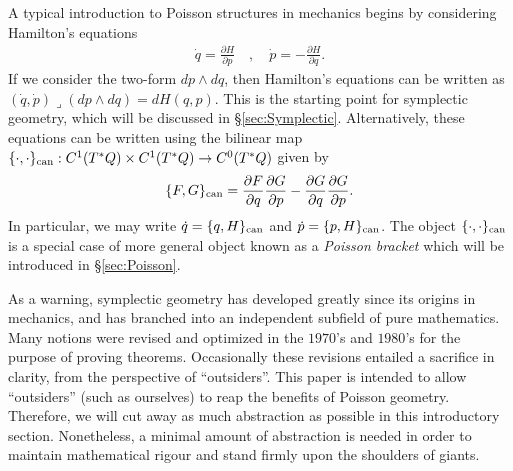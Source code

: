 \documentclass[12pt]{amsart}
\newcommand{\pder}[2]{\ensuremath{\frac{\partial #1}{\partial #2}}}
\begin{document}
A typical introduction to Poisson structures in mechanics
begins by considering Hamilton's equations
\begin{align*}
  \dot{q} = \pder{H}{p} \quad, \quad  \dot{p} = - \pder{H}{q}.
\end{align*}
If we consider the two-form $dp \wedge dq$, then Hamilton's equations
can be written as $(\dot{q},\dot{p}) \lrcorner (dp \wedge dq) = dH(q,p)$.
This is the starting point for symplectic geometry, which
will be discussed in \S \ref{sec:Symplectic}.
Alternatively, these equations can be written using the bilinear map $\{ \cdot , \cdot \}_{\rm can} : C^1( T^*Q) \times C^1(T^*Q) \to C^0(T^*Q)$
given by
\begin{align*}
  \{ F , G \}_{\rm can} = \pder{F}{q}\pder{G}{p} - \pder{G}{q} \pder{G}{p}.
\end{align*}
In particular, we may write $\dot{q} = \{ q , H \}_{\rm can}$ and $\dot{p} = \{ p , H\}_{\rm can}$.
The object $\{ \cdot , \cdot \}_{\rm can}$ is a special case of more general
object known as a \emph{Poisson bracket} which will be introduced in
\S \ref{sec:Poisson}.

As a warning, symplectic geometry has developed greatly
since its origins in mechanics, and
has branched into an independent subfield of pure mathematics.
Many notions were revised and optimized in the $1970$'s and $1980$'s for
the purpose of proving theorems.
Occasionally these revisions entailed a sacrifice
in clarity, from the perspective of ``outsiders''.
This paper is intended to allow ``outsiders''
(such as ourselves) to reap the benefits of Poisson geometry.
Therefore, we will cut away as much abstraction as possible in this introductory
section.
Nonetheless, a minimal amount of abstraction is needed in order to
maintain mathematical rigour and stand firmly upon the shoulders of giants.
\end{document}
